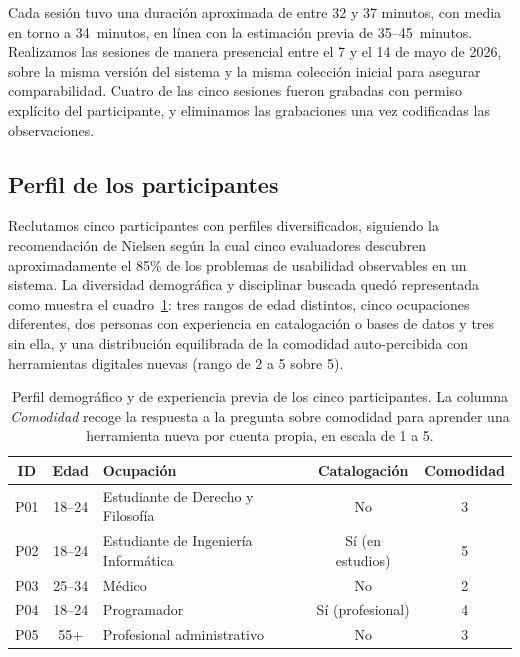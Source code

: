 Cada sesión tuvo una duración aproximada de entre 32 y 37 minutos, con media en torno a
34~minutos, en línea con la estimación previa de 35--45~minutos. Realizamos las sesiones
de manera presencial entre el 7 y el 14 de mayo de 2026, sobre la misma versión del sistema
y la misma colección inicial para asegurar comparabilidad. Cuatro de las cinco sesiones
fueron grabadas con permiso explícito del participante, y eliminamos las grabaciones
una vez codificadas las observaciones.

\subsection{Perfil de los participantes}

Reclutamos cinco participantes con perfiles diversificados, siguiendo la recomendación de
Nielsen según la cual cinco evaluadores descubren aproximadamente el 85\% de los problemas
de usabilidad observables en un sistema. La diversidad demográfica y disciplinar buscada
quedó representada como muestra el cuadro~\ref{tab:perfilParticipantes}: tres rangos de
edad distintos, cinco ocupaciones diferentes, dos personas con experiencia en catalogación
o bases de datos y tres sin ella, y una distribución equilibrada de la comodidad
auto-percibida con herramientas digitales nuevas (rango de 2 a 5 sobre 5).

\begin{table}[H]
\centering
\small
\begin{tabularx}{\textwidth}{c c X c c}
\hline
\textbf{ID} & \textbf{Edad} & \textbf{Ocupación} & \textbf{Catalogación} & \textbf{Comodidad} \\
\hline
P01 & 18--24 & Estudiante de Derecho y Filosofía & No                  & 3 \\
P02 & 18--24 & Estudiante de Ingeniería Informática & Sí (en estudios) & 5 \\
P03 & 25--34 & Médico                          & No                       & 2 \\
P04 & 18--24 & Programador                     & Sí (profesional)         & 4 \\
P05 & 55+    & Profesional administrativo      & No                       & 3 \\
\hline
\end{tabularx}
\caption[Perfil demográfico de los participantes]{Perfil demográfico y de experiencia previa de los cinco participantes. La columna
\textit{Comodidad} recoge la respuesta a la pregunta sobre comodidad para aprender una
herramienta nueva por cuenta propia, en escala de 1 a 5.}
\label{tab:perfilParticipantes}
\end{table}

